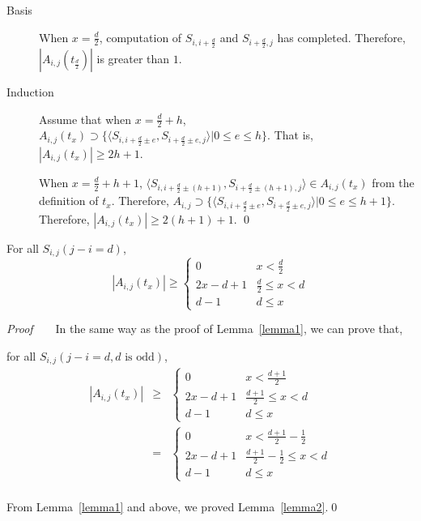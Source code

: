\begin{description}
\item [Basis] When $x = \frac{d}{2}$, computation of $S_{i,i+\frac{d}{2}}$ and $S_{i+\frac{d}{2},j}$ has completed.  Therefore, $|A_{i,j}(t_{\frac{d}{2}})|$ is greater than $1$.
\item [Induction] Assume that when $x = \frac{d}{2}+ h$,
$A_{i,j}(t_x) \supset \{ \langle S_{i,i+\frac{d}{2}\pm e},
S_{i+\frac{d}{2}\pm e,j} \rangle | 0 \leq e \leq h\}$.  That
is, $|A_{i,j}(t_x)| \geq 2h + 1$.

 When $x = \frac{d}{2} + h + 1$, $\langle S_{i,i+\frac{d}{2}\pm
(h+1)}, S_{i+\frac{d}{2}\pm (h+1),j} \rangle \in A_{i,j}(t_x)$ from
the definition of $t_x$.  Therefore, $A_{i,j} \supset \{ \langle
S_{i,i+\frac{d}{2}\pm e}, S_{i+\frac{d}{2}\pm e,j} \rangle | 0 \leq e
\leq h+1\}$.  Therefore, $|A_{i,j}(t_x)| \geq 2(h + 1) +1$. \qed
\end{description}

\begin{lemma}\label{lemma2}
 For all $S_{i,j}(j - i = d)$,
\[
|A_{i,j}(t_x)| \geq
\left\{
\begin{array}{ll}
0		& x < \frac{d}{2}\\
2x - d + 1	& \frac{d}{2} \leq x < d\\
d - 1		& d \leq x
\end{array}
\right.
\]
\end{lemma}

{\it Proof} ~ ~ In the same way as the proof of Lemma~\ref{lemma1}, we
can prove that,

 for all $S_{i,j}(j - i = d, d \mbox{ is odd})$,
\begin{eqnarray*}
|A_{i,j}(t_x)| & \geq &
\left\{
\begin{array}{ll}
0		& x < \frac{d+1}{2}\\
2x - d + 1	& \frac{d+1}{2} \leq x < d\\
d - 1		& d \leq x
\end{array}
\right.\\
& = & 
\left\{
\begin{array}{ll}
0		& x < \frac{d+1}{2}-\frac{1}{2}\\
2x - d + 1	& \frac{d+1}{2}-\frac{1}{2} \leq x < d\\
d - 1		& d \leq x
\end{array}
\right.\\
\end{eqnarray*}

 From Lemma~\ref{lemma1} and above, we proved Lemma~\ref{lemma2}.\qed

